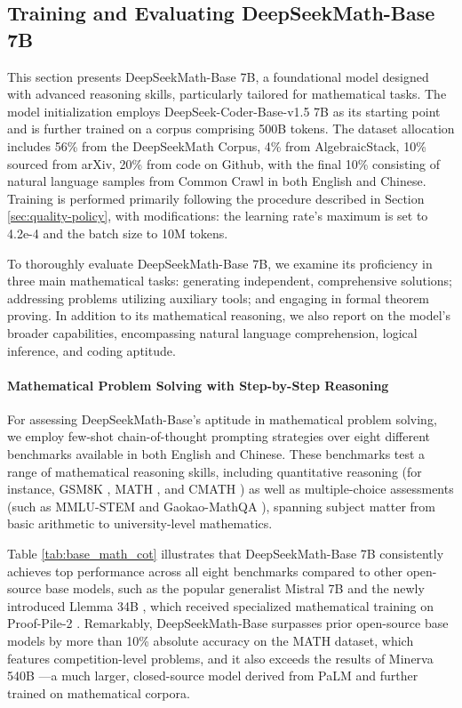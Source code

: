 \subsection{Training and Evaluating DeepSeekMath-Base 7B}

This section presents DeepSeekMath-Base 7B, a foundational model designed with advanced reasoning skills, particularly tailored for mathematical tasks. The model initialization employs DeepSeek-Coder-Base-v1.5 7B \citep{deepseek-coder} as its starting point and is further trained on a corpus comprising 500B tokens. The dataset allocation includes 56\% from the DeepSeekMath Corpus, 4\% from AlgebraicStack, 10\% sourced from arXiv, 20\% from code on Github, with the final 10\% consisting of natural language samples from Common Crawl in both English and Chinese. Training is performed primarily following the procedure described in Section \ref{sec:quality-policy}, with modifications: the learning rate's maximum is set to 4.2e-4 and the batch size to 10M tokens.

To thoroughly evaluate DeepSeekMath-Base 7B, we examine its proficiency in three main mathematical tasks: generating independent, comprehensive solutions; addressing problems utilizing auxiliary tools; and engaging in formal theorem proving. In addition to its mathematical reasoning, we also report on the model’s broader capabilities, encompassing natural language comprehension, logical inference, and coding aptitude.

\paragraph{Mathematical Problem Solving with Step-by-Step Reasoning}

For assessing DeepSeekMath-Base's aptitude in mathematical problem solving, we employ few-shot chain-of-thought prompting strategies \citep{cot} over eight different benchmarks available in both English and Chinese. These benchmarks test a range of mathematical reasoning skills, including quantitative reasoning (for instance, GSM8K \citep{gsm8k}, MATH \citep{MATH}, and CMATH \citep{wei2023cmath}) as well as multiple-choice assessments (such as MMLU-STEM \citep{mmlu} and Gaokao-MathQA \citep{agieval}), spanning subject matter from basic arithmetic to university-level mathematics.

Table \ref{tab:base_math_cot} illustrates that DeepSeekMath-Base 7B consistently achieves top performance across all eight benchmarks compared to other open-source base models, such as the popular generalist Mistral 7B \citep{mistral} and the newly introduced Llemma 34B \citep{llemma}, which received specialized mathematical training on Proof-Pile-2 \citep{llemma}. Remarkably, DeepSeekMath-Base surpasses prior open-source base models by more than 10\% absolute accuracy on the MATH dataset, which features competition-level problems, and it also exceeds the results of Minerva 540B \citep{minerva}—a much larger, closed-source model derived from PaLM \citep{palm} and further trained on mathematical corpora.


